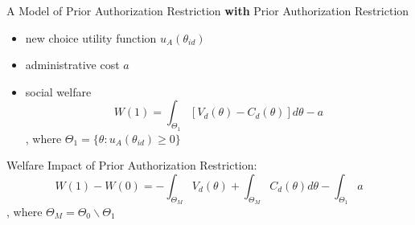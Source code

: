 \begin{frame}{A Model of Prior Authorization Restriction}
    \textbf{with} Prior Authorization Restriction
    \begin{itemize}
       \item new choice utility function $u_A(\theta_{id})$
       \item administrative cost $a$
       \item social welfare $$W(1)=\int_{\Theta_1} [V_d(\theta)-C_d(\theta)]d\theta -a$$, where  $\Theta_1 = \{\theta: u_A(\theta_{id}) \geq 0\}$
    \end{itemize}
    Welfare Impact of Prior Authorization Restriction:
    $$W(1)-W(0) = -\int_{\Theta_M} V_d(\theta)+\int_{\Theta_M} C_d(\theta)d\theta -\int_{\Theta_1}a $$
    , where $\Theta_M = \Theta_0 \backslash \Theta_1 $
\end{frame}